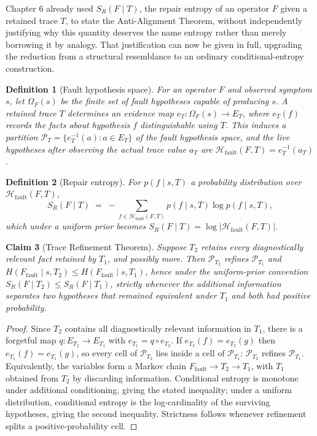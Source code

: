 \documentclass[12pt]{report}
\newtheorem{definition}{Definition}[section]
\newtheorem{claim}[definition]{Claim}
\newcommand{\SR}{\ensuremath{S_R}}
\begin{document}
Chapter 6 already used $\SR(F \mid T)$, the repair entropy of an operator
$F$ given a retained trace $T$, to state the Anti-Alignment Theorem,
without independently justifying why this quantity deserves the name
entropy rather than merely borrowing it by analogy. That justification
can now be given in full, upgrading the reduction from a structural
resemblance to an ordinary conditional-entropy construction.

\begin{definition}[Fault hypothesis space]
\label{def:fault-space}
For an operator $F$ and observed symptom $s$, let $\Omega_F(s)$ be the
finite set of fault hypotheses capable of producing $s$. A retained trace
$T$ determines an evidence map $e_T : \Omega_F(s) \to E_T$, where
$e_T(f)$ records the facts about hypothesis $f$ distinguishable using
$T$. This induces a partition $\mathcal{P}_T = \{e_T^{-1}(a) : a \in
E_T\}$ of the fault hypothesis space, and the live hypotheses after
observing the actual trace value $a_T$ are
$\mathcal{H}_{\mathrm{fault}}(F,T) = e_T^{-1}(a_T)$.
\end{definition}

\begin{definition}[Repair entropy]
\label{def:repair-entropy-shannon}
For $p(f \mid s,T)$ a probability distribution over
$\mathcal{H}_{\mathrm{fault}}(F,T)$,
\[
\SR(F \mid T) \;=\; -\sum_{f \in \mathcal{H}_{\mathrm{fault}}(F,T)} p(f\mid s,T) \log p(f \mid s,T),
\]
which under a uniform prior becomes $\SR(F\mid T) = \log|\mathcal{H}_{\mathrm{fault}}(F,T)|$.
\end{definition}

\begin{claim}[Trace Refinement Theorem]
\label{thm:trace-refinement}
Suppose $T_2$ retains every diagnostically relevant fact retained by
$T_1$, and possibly more. Then $\mathcal{P}_{T_2}$ refines $\mathcal{P}_{T_1}$
and $H(F_{\mathrm{fault}} \mid s,T_2) \leq H(F_{\mathrm{fault}} \mid s,T_1)$,
hence under the uniform-prior convention $\SR(F\mid T_2) \leq \SR(F\mid T_1)$,
strictly whenever the additional information separates two hypotheses
that remained equivalent under $T_1$ and both had positive probability.
\end{claim}

\begin{proof}
Since $T_2$ contains all diagnostically relevant information in $T_1$,
there is a forgetful map $q : E_{T_2} \to E_{T_1}$ with $e_{T_1} = q
\circ e_{T_2}$. If $e_{T_2}(f) = e_{T_2}(g)$ then $e_{T_1}(f) = e_{T_1}(g)$,
so every cell of $\mathcal{P}_{T_2}$ lies inside a cell of $\mathcal{P}_{T_1}$:
$\mathcal{P}_{T_2}$ refines $\mathcal{P}_{T_1}$. Equivalently, the
variables form a Markov chain $F_{\mathrm{fault}} \to T_2 \to T_1$, with
$T_1$ obtained from $T_2$ by discarding information. Conditional entropy
is monotone under additional conditioning, giving the stated inequality;
under a uniform distribution, conditional entropy is the log-cardinality
of the surviving hypotheses, giving the second inequality. Strictness
follows whenever refinement splits a positive-probability cell.
\end{proof}
\end{document}
